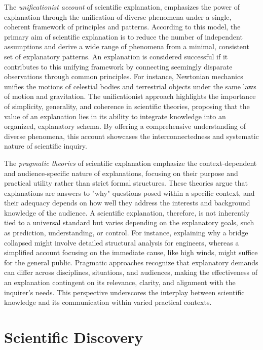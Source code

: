 The \emph{unificationist account} of scientific explanation, emphasizes the power of explanation through the unification of diverse phenomena under a single, coherent framework of principles and patterns. According to this model, the primary aim of scientific explanation is to reduce the number of independent assumptions and derive a wide range of phenomena from a minimal, consistent set of explanatory patterns. An explanation is considered successful if it contributes to this unifying framework by connecting seemingly disparate observations through common principles. For instance, Newtonian mechanics unifies the motions of celestial bodies and terrestrial objects under the same laws of motion and gravitation. The unificationist approach highlights the importance of simplicity, generality, and coherence in scientific theories, proposing that the value of an explanation lies in its ability to integrate knowledge into an organized, explanatory schema. By offering a comprehensive understanding of diverse phenomena, this account showcases the interconnectedness and systematic nature of scientific inquiry.

The \emph{pragmatic theories} of scientific explanation emphasize the context-dependent and audience-specific nature of explanations, focusing on their purpose and practical utility rather than strict formal structures. These theories argue that explanations are answers to "why" questions posed within a specific context, and their adequacy depends on how well they address the interests and background knowledge of the audience. A scientific explanation, therefore, is not inherently tied to a universal standard but varies depending on the explanatory goals, such as prediction, understanding, or control. For instance, explaining why a bridge collapsed might involve detailed structural analysis for engineers, whereas a simplified account focusing on the immediate cause, like high winds, might suffice for the general public. Pragmatic approaches recognize that explanatory demands can differ across disciplines, situations, and audiences, making the effectiveness of an explanation contingent on its relevance, clarity, and alignment with the inquirer's needs. This perspective underscores the interplay between scientific knowledge and its communication within varied practical contexts.


%
%

\section{Scientific Discovery}

